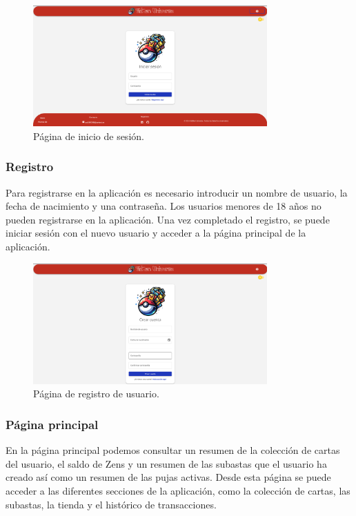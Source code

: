 \begin{figure}[H]
    \centering
    \includegraphics[width=0.8\textwidth]{figures/6-Analisis/6-Interfaz/interfaz/login.png}
    \caption{Página de inicio de sesión.}
    \label{fig:m-interfaz-login}
\end{figure}


\subsubsection{Registro}
Para registrarse en la aplicación es necesario introducir un nombre de usuario, la fecha de nacimiento y una contraseña.
Los usuarios menores de 18 años no pueden registrarse en la aplicación.
Una vez completado el registro, se puede iniciar sesión con el nuevo usuario y acceder a la página principal de la aplicación.

\begin{figure}[H]
    \centering
    \includegraphics[width=0.8\textwidth]{figures/6-Analisis/6-Interfaz/interfaz/signup.png}
    \caption{Página de registro de usuario.}
    \label{fig:m-interfaz-registro}
\end{figure}


\subsubsection{Página principal}
En la página principal podemos consultar un resumen de la colección de cartas del usuario, el saldo de Zens y un resumen
de las subastas que el usuario ha creado así como un resumen de las pujas activas.
Desde esta página se puede acceder a las diferentes secciones de la aplicación, como la colección de cartas, las subastas, la tienda
y el histórico de transacciones.

